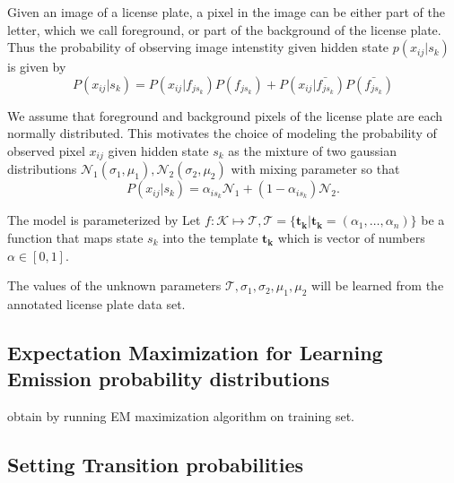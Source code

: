 \documentclass[a4paper,12pt]{article}
\newcounter{ohNoteCounter}
\newcommand{\ohnote}[1]{{\scriptsize  \color{Cgreen} $\clubsuit$~\refstepcounter{ohNoteCounter}\textsf{[OH]$_{\arabic{ohNoteCounter}}$:{#1}}}}
\newcounter{jpNoteCounter}
\newcommand{\jpnote}[1]{{\scriptsize  \color{Cblue} $\blacksquare$ \refstepcounter{jpNoteCounter}\textsf{[JP]$_{\arabic{jpNoteCounter}}$:{#1}}}}
\renewcommand{\jpnote}[1]{}
\renewcommand{\ohnote}[1]{}
\begin{document}
  Given an image of a license plate, a pixel in the image can be
  either part of the letter, which we call foreground, or part of the
  background of the license plate.  Thus the probability of observing
  image intenstity given hidden state $p(x_{ij}|s_k)$ is given by
  \begin{equation}
    P(x_{ij}|s_k)=P(x_{ij}|f_{js_k})P(f_{js_k})+P(x_{ij}|\bar{f_{js_k}})P(\bar{f_{js_k}})
  \end{equation}
  
  
  We assume that foreground and background pixels of the license plate
  are each normally distributed.  This motivates the choice of
  modeling the probability of observed pixel $x_{ij}$ given hidden
  state $s_k$ as the mixture of two gaussian distributions
  $\mathcal{N}_1(\sigma_1, \mu_1), \mathcal{N}_2(\sigma_2, \mu_2)$
  with mixing parameter so that
  \begin{equation}
    P(x_{ij} | s_k) = \alpha_{is_k} \mathcal{N}_1 + (1-\alpha_{is_k})
    \mathcal{N}_2 .
  \end{equation}

  \jpnote{need to talk about how the model enables different
    distributions for each row of each hidden state}

  
  The model is parameterized by Let $f : \mathcal{K} \mapsto
  \mathcal{T}, \mathcal{T} = \{ \mathbf{t_k} | \mathbf{t_k} =
  (\alpha_1 , \dots , \alpha_n)\}$ be a function that maps state $s_k$
  into the template $\mathbf{t_k}$ which is vector of numbers $\alpha
  \in [0, 1]$.

  The values of the unknown parameters $\mathcal{T}, \sigma_1,
  \sigma_2, \mu_1, \mu_2$ will be learned from the annotated license
  plate data set.

  

  \subsection{Expectation Maximization for Learning Emission
    probability distributions}
 obtain by running EM maximization
  algorithm on training set.
 

  

  \ohnote{Describe usage of EM alg.}


  \subsection{Setting Transition probabilities}
\end{document}
